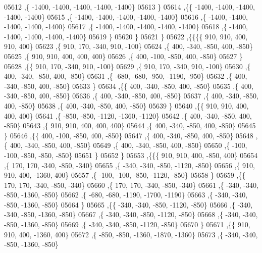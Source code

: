\begin{DoxyCode}
05612     ,\{ -1400, -1400, -1400, -1400, -1400\}
05613     \}
05614    ,\{\{ -1400, -1400, -1400, -1400, -1400\}
05615     ,\{ -1400, -1400, -1400, -1400, -1400\}
05616     ,\{ -1400, -1400, -1400, -1400, -1400\}
05617     ,\{ -1400, -1400, -1400, -1400, -1400\}
05618     ,\{ -1400, -1400, -1400, -1400, -1400\}
05619     \}
05620    \}
05621   \}
05622  ,\{\{\{\{   910,   910,   400,   910,   400\}
05623     ,\{   910,   170,  -340,   910,  -100\}
05624     ,\{   400,  -340,  -850,   400,  -850\}
05625     ,\{   910,   910,   400,   400,   400\}
05626     ,\{   400,  -100,  -850,   400,  -850\}
05627     \}
05628    ,\{\{   910,   170,  -340,   910,  -100\}
05629     ,\{   910,   170,  -340,   910,  -100\}
05630     ,\{   400,  -340,  -850,   400,  -850\}
05631     ,\{  -680,  -680,  -950, -1190,  -950\}
05632     ,\{   400,  -340,  -850,   400,  -850\}
05633     \}
05634    ,\{\{   400,  -340,  -850,   400,  -850\}
05635     ,\{   400,  -340,  -850,   400,  -850\}
05636     ,\{   400,  -340,  -850,   400,  -850\}
05637     ,\{   400,  -340,  -850,   400,  -850\}
05638     ,\{   400,  -340,  -850,   400,  -850\}
05639     \}
05640    ,\{\{   910,   910,   400,   400,   400\}
05641     ,\{  -850,  -850, -1120, -1360, -1120\}
05642     ,\{   400,  -340,  -850,   400,  -850\}
05643     ,\{   910,   910,   400,   400,   400\}
05644     ,\{   400,  -340,  -850,   400,  -850\}
05645     \}
05646    ,\{\{   400,  -100,  -850,   400,  -850\}
05647     ,\{   400,  -340,  -850,   400,  -850\}
05648     ,\{   400,  -340,  -850,   400,  -850\}
05649     ,\{   400,  -340,  -850,   400,  -850\}
05650     ,\{  -100,  -100,  -850,  -850,  -850\}
05651     \}
05652    \}
05653   ,\{\{\{   910,   910,   400,  -850,   400\}
05654     ,\{   170,   170,  -340,  -850,  -340\}
05655     ,\{  -340,  -340,  -850, -1120,  -850\}
05656     ,\{   910,   910,   400, -1360,   400\}
05657     ,\{  -100,  -100,  -850, -1120,  -850\}
05658     \}
05659    ,\{\{   170,   170,  -340,  -850,  -340\}
05660     ,\{   170,   170,  -340,  -850,  -340\}
05661     ,\{  -340,  -340,  -850, -1360,  -850\}
05662     ,\{  -680,  -680, -1190, -1700, -1190\}
05663     ,\{  -340,  -340,  -850, -1360,  -850\}
05664     \}
05665    ,\{\{  -340,  -340,  -850, -1120,  -850\}
05666     ,\{  -340,  -340,  -850, -1360,  -850\}
05667     ,\{  -340,  -340,  -850, -1120,  -850\}
05668     ,\{  -340,  -340,  -850, -1360,  -850\}
05669     ,\{  -340,  -340,  -850, -1120,  -850\}
05670     \}
05671    ,\{\{   910,   910,   400, -1360,   400\}
05672     ,\{  -850,  -850, -1360, -1870, -1360\}
05673     ,\{  -340,  -340,  -850, -1360,  -850\}

\end{DoxyCode}
